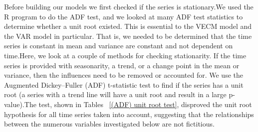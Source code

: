 Before building our models we first checked  if the series is stationary.We used the R program to do the ADF test, and we looked at many ADF test statistics to determine whether a unit root existed. This is essential to the VECM model and the VAR model in particular. That is, we needed to be determined that the time series is constant in mean and variance are constant and not dependent on time.Here, we look at a couple of methods for checking stationarity. If the time series is provided with seasonarity, a trend, or a change point in the mean or variance, then the influences need to be removed or accounted for. We use the Augmented Dickey–Fuller (ADF) t-statistic test to find if the series has a unit root (a series with a trend line will have a unit root and result in a large p-value).\parencite{dickey1979distribution}The test, shown in Tables ~\ref{(ADF) unit root test}, disproved the unit root hypothesis for all time series taken into account, suggesting that the relationships between the numerous variables investigated below are not fictitious.
\label{Chapter4} %
